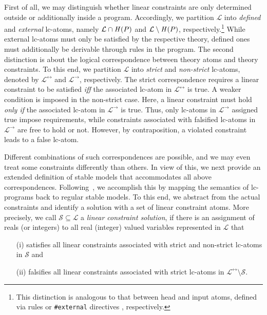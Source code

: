 First of all,
we may distinguish whether linear constraints are only determined outside or additionally inside a program.
%
Accordingly,
we partition $\mathcal{L}$ into
\emph{defined} and \emph{external} lc-atoms,
namely $\mathcal{L}\cap\mathit{H}(P)$ and $\mathcal{L}\setminus\mathit{H}(P)$, 
respectively.\footnote{This distinction is analogous to that between head and input atoms,
  defined via rules or \lstinline{#external} directives \cite{gekakasc14b}, respectively.}
%
While external lc-atoms must only be satisfied by the respective theory,
defined ones must additionally be derivable through rules in the program.
%
The second distinction is about the logical correspondence between theory atoms and theory constraints.
%
To this end,
we partition $\mathcal{L}$ into
\emph{strict} and \emph{non-strict} lc-atoms,
denoted by $\mathcal{L}^\leftrightarrow$ and $\mathcal{L}^\rightarrow$, respectively.
%
The strict correspondence requires
a linear constraint to be satisfied 
\textit{iff}
the associated lc-atom in $\mathcal{L}^\leftrightarrow$ is true.
%
A weaker condition is imposed in the non-strict case.
Here, a linear constraint must hold 
\textit{only if}
the associated lc-atom in $\mathcal{L}^\rightarrow$ is true.
%
Thus, only lc-atoms in $\mathcal{L}^\rightarrow$ assigned true impose requirements, 
while constraints associated with falsified lc-atoms in $\mathcal{L}^\rightarrow$ are free to hold or not.
%
However, by contraposition, a violated constraint leads to a false lc-atom.

Different combinations of such correspondences are possible,
and we may even treat some constraints differently than others.
In view of this, we next provide an extended definition of stable models that accommodates all above correspondences.
%
Following~\cite{gekakaosscwa16a},
we accomplish this by mapping the semantics of lc-programs back to regular stable models.
%
To this end,
we abstract from the actual constraints and identify a solution with a set of linear constraint atoms.
%
More precisely,
we call
\(
\mathcal{S}\subseteq\mathcal{L}
\)
a \emph{linear constraint solution},
if there is an assignment of reals (or integers) to all real (integer) valued variables represented in $\mathcal{L}$ that 
\begin{enumerate}
 \item[(i)]  \label{en:lcsol1} satisfies all linear constraints associated with strict and non-strict lc-atoms in $\mathcal{S}$ and
 \item[(ii)] \label{en:lcsol2} falsifies all linear constraints associated with strict lc-atoms in $\mathcal{L}^\leftrightarrow\setminus\mathcal{S}$.
\end{enumerate}

